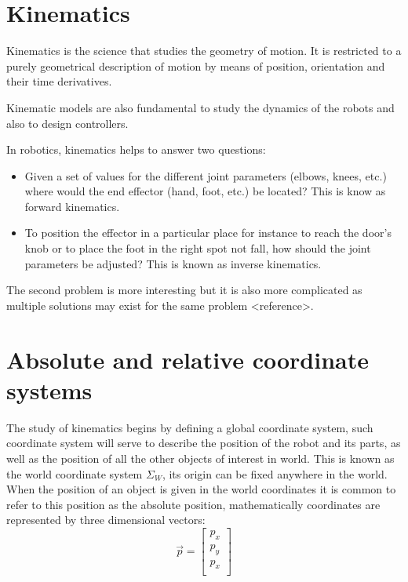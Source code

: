 \documentclass[a4paper]{report}
\begin{document}
\section{Kinematics}
Kinematics is the science that studies the geometry of motion. It is restricted
to a purely geometrical description of motion by means of position, orientation
and their time derivatives.

Kinematic models are also fundamental to study the dynamics of the robots and
also to design controllers.

In robotics, kinematics helps to answer two questions:
\begin{itemize}
    \item{} Given a set of values for the different joint parameters (elbows,
        knees, etc.) where would the end effector (hand, foot, etc.) be located?
        This is know as forward kinematics.
    \item{} To position the effector in a particular place for instance to reach
        the door's knob or to place the foot in the right spot not fall, how
        should the joint parameters be adjusted? This is known as inverse kinematics.
\end{itemize}

The second problem is more interesting but it is also more complicated as multiple
solutions may exist for the same problem <reference>.


\section{Absolute and relative coordinate systems}
The study of kinematics begins by defining a global coordinate system, such
coordinate system will serve to describe the position of the robot and its
parts, as well as the position of all the other objects of interest in world.
This is known as the world coordinate system $\Sigma_W$, its origin can be
fixed anywhere in the world. When the position of an object is given in the
world coordinates it is common to refer to this position as the absolute
position, mathematically coordinates are represented by three dimensional vectors:
\begin{equation}
    \vec{p} = \begin{bmatrix}
        p_x\\
        p_y\\
        p_x\\
    \end{bmatrix}
\end{equation}
\end{document}
